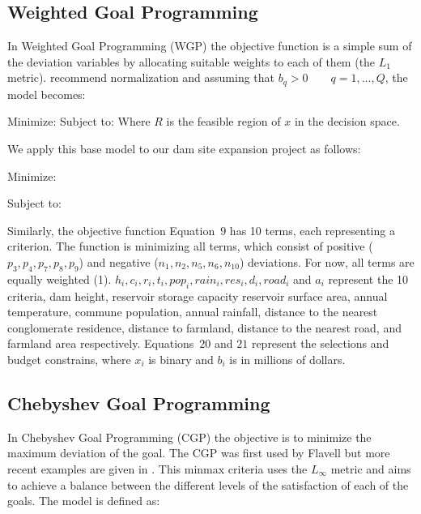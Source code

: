 \subsection{Weighted Goal Programming}
In Weighted Goal Programming (WGP) the objective function is a simple sum of the deviation variables by allocating suitable weights to each of them (the $L_1 $ metric). \cite{jones2010} recommend normalization and assuming that $b_q > 0 \qquad q = 1, ..., Q$, the model becomes:

Minimize:
            \EqWGPMinFunctionFive
Subject to:
            \EqGGPMinFunctionSubTwo
            \EqGGPMinFunctionSubThree
            \EqGGPMinFunctionSubFour
Where $R$ is the feasible region of $x$ in the decision space.

We apply this base model to our dam site expansion project as follows:

Minimize:
        \EqDamWGPObjectiveEleven

Subject to:
        \EqDamHeightConstraintTwelve
        \EqDamCapacityConstraintThirteen
        \EqReservoirAreaConstraintFourteen
        \EqTemperatureConstraintFifteen
        \EqPopulationConstraintSixteen
        \EqRainfallConstraintSeventeen
        \EqResidenceConstraintEighteen
        \EqFarmlandDistanceConstraintNineteen
        \EqNearestRoadConstraintTwenty
        \EqFarmlandAreaConstraintTwentyOne
        \EqSelectThreeDamsTwentyTwo
        \EqBudgetConstraintTwentyThree

Similarly, the objective function Equation~$9$ has 10 terms, each representing a criterion. The function is minimizing all terms, which consist of positive ($p_3,p_4,p_7,p_8,p_9$) and negative ($n_1,n_2,n_5,n_6,n_10$) deviations. For now, all terms are equally weighted (1). $h_i, c_i, r_i, t_i, pop_i, rain_i, res_i, d_i, road_i$ and $a_i$ represent the 10 criteria, dam height, reservoir storage capacity reservoir surface area,  annual temperature,   commune population, annual rainfall, distance to the nearest conglomerate residence, distance to farmland, distance to the nearest road, and farmland area respectively. Equations~$20$ and $21$
represent the selections and budget constrains, where $x_i$ is binary and  $b_i$ is in millions of dollars.

\subsection{Chebyshev Goal Programming}
In Chebyshev Goal Programming (CGP) the objective is to minimize the maximum deviation of the goal. The CGP was first used by Flavell\cite{FLAVELL1976} but more recent examples are given in \cite{Despotis2008,HO2019}. This minmax criteria uses the $L_\infty$ metric and aims to achieve a balance between the different levels of the satisfaction of each of the goals. The model is defined as:

